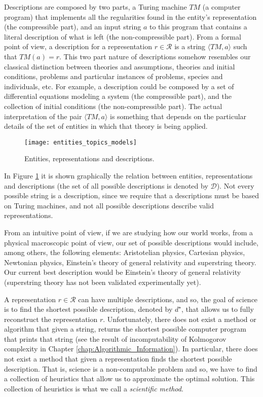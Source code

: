 Descriptions are composed by two parts, a Turing machine $TM$ (a computer program) that implements all the regularities found in the entity's representation (the compressible part), and an input string $a$ to this program that contains a literal description of what is left (the non-compressible part). From a formal point of view, a description for a representation $r \in \mathcal{R}$ is a string $\langle TM, a \rangle$ such that $TM(a) = r$. This two part nature of descriptions somehow resembles our classical distinction between theories and assumptions, theories and initial conditions, problems and particular instances of problems, species and individuals, etc. For example, a description could be composed by a set of differential equations modeling a system (the compressible part), and the collection of initial conditions (the non-compressible part). The actual interpretation of the pair $\langle TM, a \rangle$ is something that depends on the particular details of the set of entities in which that theory is being applied.

\begin{figure}[h]
\centering\texttt{[image: entities\_topics\_models]}
\caption{\label{fig:entities_topics_models}Entities, representations and descriptions.}
\end{figure}

In Figure \ref{fig:entities_topics_models} it is shown graphically the relation between entities, representations and descriptions (the set of all possible descriptions is denoted by $\mathcal{D}$). Not every possible string is a description, since we require that a descriptions must be based on Turing machines, and not all possible descriptions describe valid representations.

\begin{example}
From an intuitive point of view, if we are studying how our world works, from a physical macroscopic point of view, our set of possible descriptions would include, among others, the following elements: Aristotelian physics, Cartesian physics, Newtonian physics, Einstein's theory of general relativity and superstring theory. Our current best description would be  Einstein's theory of general relativity (superstring theory has not been validated experimentally yet).
\end{example}

A representation $r \in \mathcal{R}$ can have multiple descriptions, and so, the goal of science is to find the shortest possible description, denoted by $d^\star$, that allows us to fully reconstruct the representation $r$. Unfortunately, there does not exist a method or algorithm that given a string, returns the shortest possible computer program that prints that string (see the result of incomputability of Kolmogorov complexity in Chapter \ref{chap:Algorithmic_Information}). In particular, there does not exist a method that given a representation finds the shortest possible description. That is, science is a non-computable problem and so, we have to find a collection of heuristics that allow us to approximate the optimal solution. This collection of heuristics is what we call a \emph{scientific method}.

